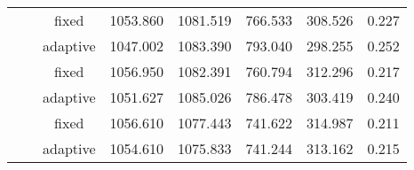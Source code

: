 \begin{table}
\begin{tabular}[t]{cccccccc}
\cmidrule{2-8}
 &  & fixed & 1053.860 & 1081.519 & 766.533 & 308.526 & 0.227\\
\cmidrule{3-8}
 &  & adaptive & 1047.002 & 1083.390 & 793.040 & 298.255 & 0.252\\
\cmidrule{2-8}
 &  & fixed & 1056.950 & 1082.391 & 760.794 & 312.296 & 0.217\\
\cmidrule{3-8}
 &  & adaptive & 1051.627 & 1085.026 & 786.478 & 303.419 & 0.240\\
\cmidrule{2-8}
 &  & fixed & 1056.610 & 1077.443 & 741.622 & 314.987 & 0.211\\
\cmidrule{3-8}
 &  & adaptive & 1054.610 & 1075.833 & 741.244 & 313.162 & 0.215\\
\bottomrule
\end{tabular}
\end{table}